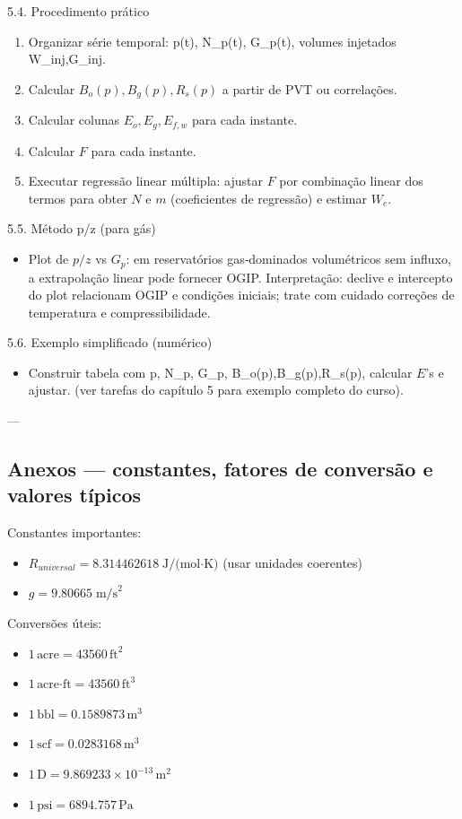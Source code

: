 \documentclass[11pt,a4paper]{article}
\begin{document}
5.4. Procedimento prático
\begin{enumerate}
\item Organizar série temporal: p(t), N_p(t), G_p(t), volumes injetados W_{inj},G_{inj}.
\item Calcular $B_o(p),B_g(p),R_s(p)$ a partir de PVT ou correlações.
\item Calcular colunas $E_o,E_g,E_{f,w}$ para cada instante.
\item Calcular $F$ para cada instante.
\item Executar regressão linear múltipla: ajustar $F$ por combinação linear dos termos para obter $N$ e $m$ (coeficientes de regressão) e estimar $W_e$.
\end{enumerate}

5.5. Método p/z (para gás)
\begin{itemize}
\item Plot de $p/z$ vs $G_p$: em reservatórios gas‑dominados volumétricos sem influxo, a extrapolação linear pode fornecer OGIP. Interpretação: declive e intercepto do plot relacionam OGIP e condições iniciais; trate com cuidado correções de temperatura e compressibilidade.
\end{itemize}

5.6. Exemplo simplificado (numérico)
\begin{itemize}
\item Construir tabela com p, N_p, G_p, B_o(p),B_g(p),R_s(p), calcular $E$'s e ajustar. (ver tarefas do capítulo 5 para exemplo completo do curso).
\end{itemize}

---

\subsection{Anexos — constantes, fatores de conversão e valores típicos}

Constantes importantes:
\begin{itemize}
\item $R_{universal}=8.314462618\;\text{J/(mol·K)}$ (usar unidades coerentes)
\item $g=9.80665\;\text{m/s}^2$
\end{itemize}

Conversões úteis:
\begin{itemize}
\item $1\,\text{acre}=43560\,\text{ft}^2$
\item $1\,\text{acre·ft}=43560\,\text{ft}^3$
\item $1\,\text{bbl}=0.1589873\,\text{m}^3$
\item $1\,\text{scf}=0.0283168\,\text{m}^3$
\item $1\,\text{D}=9.869233\times10^{-13}\,\text{m}^2$
\item $1\,\text{psi}=6894.757\,\text{Pa}$
\end{itemize}
\end{document}
